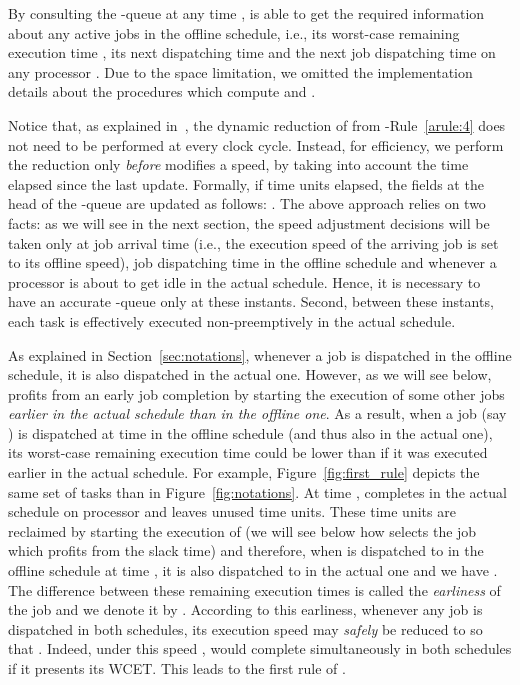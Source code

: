 \documentclass[times, 10pt,twocolumn]{article}
\begin{document}
By consulting the -queue at any time ,  is able to get the required information about any active jobs  in the offline schedule, i.e., its worst-case remaining execution time , its next dispatching time  and the next job dispatching time  on any processor . Due to the space limitation, we omitted the implementation details about the procedures which compute  and .

Notice that, as explained in~\cite{AyMeMoMe:04}, the dynamic reduction of  from -Rule~\ref{arule:4} does not need to be performed at every clock cycle. Instead, for efficiency, we perform the reduction only \emph{before}  modifies a speed, by taking into account the time elapsed since the last update. Formally, if  time units elapsed, the  fields at the head of the -queue are updated as follows: . The above approach relies on two facts: as we will see in the next section, the speed adjustment decisions will be taken only at job arrival time (i.e., the execution speed of the arriving job is set to its offline speed), job dispatching time in the offline schedule and whenever a processor is about to get idle in the actual schedule. Hence, it is necessary to have an accurate -queue only at these instants. Second, between these instants, each task is effectively executed non-preemptively in the actual schedule. 

\label{sec:principemora}
As explained in Section~\ref{sec:notations}, whenever a job is dispatched in the offline schedule, it is also dispatched in the actual one. However, as we will see below,  profits from an early job completion by starting the execution of some other jobs \emph{earlier in the actual schedule than in the offline one}. As a result,  when a job (say ) is dispatched at time  in the offline schedule (and thus also in the actual one), its worst-case remaining execution time  could be lower than  if it was executed earlier in the actual schedule. For example, Figure~\ref{fig:first_rule} depicts the same set of tasks than in Figure~\ref{fig:notations}. At time ,  completes in the actual schedule on processor  and leaves  unused time units. These  time units are reclaimed by starting the execution of  (we will see below how  selects the job which profits from the slack time) and therefore, when  is dispatched to  in the offline schedule at time , it is also dispatched to  in the actual one and we have . The difference between these remaining execution times is called the \emph{earliness} of the job and we denote it by . According to this earliness, whenever any job  is dispatched in both schedules, its execution speed  may \emph{safely} be reduced to  so that . Indeed, under this speed ,  would complete simultaneously in both schedules if it presents its WCET. This leads to the first rule of .
\end{document}
